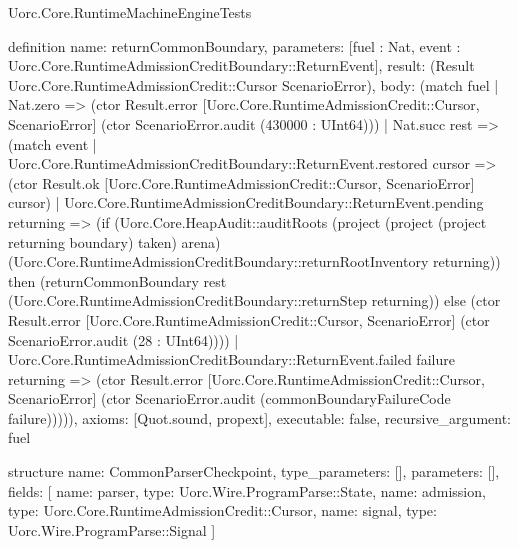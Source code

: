 \begin{lexlean}{Uorc.Core.RuntimeMachineEngineTests}
\begin{semanticmodule}
definition{
  name: returnCommonBoundary,
  parameters: [fuel : Nat, event : Uorc.Core.RuntimeAdmissionCreditBoundary::ReturnEvent],
  result: (Result Uorc.Core.RuntimeAdmissionCredit::Cursor ScenarioError),
  body: (match fuel
    | Nat.zero => (ctor Result.error [Uorc.Core.RuntimeAdmissionCredit::Cursor, ScenarioError] (ctor ScenarioError.audit (430000 : UInt64)))
    | Nat.succ rest => (match event
      | Uorc.Core.RuntimeAdmissionCreditBoundary::ReturnEvent.restored cursor => (ctor Result.ok [Uorc.Core.RuntimeAdmissionCredit::Cursor, ScenarioError] cursor)
      | Uorc.Core.RuntimeAdmissionCreditBoundary::ReturnEvent.pending returning => (if (Uorc.Core.HeapAudit::auditRoots (project (project (project returning boundary) taken) arena) (Uorc.Core.RuntimeAdmissionCreditBoundary::returnRootInventory returning)) then (returnCommonBoundary rest (Uorc.Core.RuntimeAdmissionCreditBoundary::returnStep returning)) else (ctor Result.error [Uorc.Core.RuntimeAdmissionCredit::Cursor, ScenarioError] (ctor ScenarioError.audit (28 : UInt64))))
      | Uorc.Core.RuntimeAdmissionCreditBoundary::ReturnEvent.failed failure returning => (ctor Result.error [Uorc.Core.RuntimeAdmissionCredit::Cursor, ScenarioError] (ctor ScenarioError.audit (commonBoundaryFailureCode failure))))),
  axioms: [Quot.sound, propext],
  executable: false,
  recursive_argument: fuel
}

structure{
  name: CommonParserCheckpoint,
  type_parameters: [],
  parameters: [],
  fields: [
    {name: parser, type: Uorc.Wire.ProgramParse::State},
    {name: admission, type: Uorc.Core.RuntimeAdmissionCredit::Cursor},
    {name: signal, type: Uorc.Wire.ProgramParse::Signal}
  ]
}


\end{semanticmodule}
\end{lexlean}
